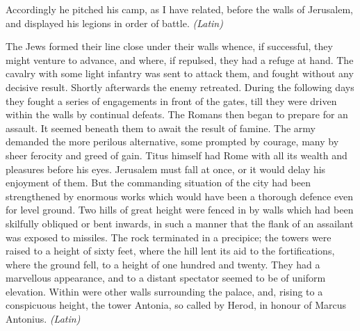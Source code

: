 Accordingly he pitched his camp, as I have related, before the walls of Jerusalem, and displayed his legions in order of battle. \emph{(Latin)}


The Jews formed their line close under their walls whence, if successful, they might venture to advance, and where, if repulsed, they had a refuge at hand. The cavalry with some light infantry was sent to attack them, and fought without any decisive result. Shortly afterwards the enemy retreated. During the following days they fought a series of engagements in front of the gates, till they were driven within the walls by continual defeats. The Romans then began to prepare for an assault. It seemed beneath them to await the result of famine. The army demanded the more perilous alternative, some prompted by courage, many by sheer ferocity and greed of gain. Titus himself had Rome with all its wealth and pleasures before his eyes. Jerusalem must fall at once, or it would delay his enjoyment of them. But the commanding situation of the city had been strengthened by enormous works which would have been a thorough defence even for level ground. Two hills of great height were fenced in by walls which had been skilfully obliqued or bent inwards, in such a manner that the flank of an assailant was exposed to missiles. The rock terminated in a precipice; the towers were raised to a height of sixty feet, where the hill lent its aid to the fortifications, where the ground fell, to a height of one hundred and twenty. They had a marvellous appearance, and to a distant spectator seemed to be of uniform elevation. Within were other walls surrounding the palace, and, rising to a conspicuous height, the tower Antonia, so called by Herod, in honour of Marcus Antonius. \emph{(Latin)}



